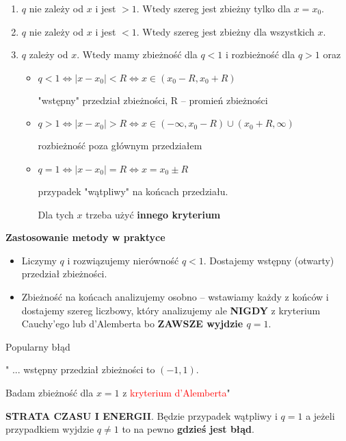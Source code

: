 \begin{enumerate}
    \item $q$ nie zależy od $x$ i jest $> 1$. Wtedy szereg jest zbieżny tylko dla $x = x_0$.
    \item $q$ nie zależy od $x$ i jest $< 1$. Wtedy szereg jest zbieżny dla wszystkich $x$.
    \item $q$ zależy od $x$. Wtedy mamy zbieżność dla $q < 1$ i rozbieżność dla $q > 1$ oraz
    
    \begin{itemize}
        \item $ q < 1 \Leftrightarrow |x - x_0| < R \Leftrightarrow x \in (x_0 - R, x_0 + R) $
        
        "wstępny" przedział zbieżności, R -- promień zbieżności

        \item $ q > 1 \Leftrightarrow |x - x_0| > R \Leftrightarrow x \in (-\infty, x_0 - R)\cup(x_0 + R, \infty) $

        rozbieżność poza głównym przedziałem
        
        \item $ q = 1 \Leftrightarrow |x - x_0| = R \Leftrightarrow x = x_0 \pm R $
        
        przypadek "wątpliwy" na końcach przedziału.
        
        Dla tych $x$ trzeba użyć \textbf{innego kryterium} \\
    \end{itemize}
\end{enumerate}

\textbf{Zastosowanie metody w praktyce}

\begin{itemize}
    \item Liczymy $q$ i rozwiązujemy nierówność $q < 1$. Dostajemy wstępny (otwarty) przedział zbieżności.
    \item Zbieżność na końcach analizujemy osobno -- wstawiamy każdy z końców i dostajemy szereg liczbowy, który analizujemy
    ale \textbf{NIGDY} z kryterium Cauchy'ego lub d'Alemberta bo \textbf{ZAWSZE wyjdzie $q = 1$}. \\
\end{itemize}

\begin{blad}{Popularny błąd}

" ... wstępny przedział zbieżności to $(-1, 1)$.

Badam zbieżność dla $x=1$ z \textcolor{red}{kryterium d'Alemberta}" \bigskip

\textbf{STRATA CZASU I ENERGII}. Będzie przypadek wątpliwy i $q = 1$ a jeżeli przypadkiem wyjdzie
$q \neq 1$ to na pewno \textbf{gdzieś jest błąd}.
\end{blad}

